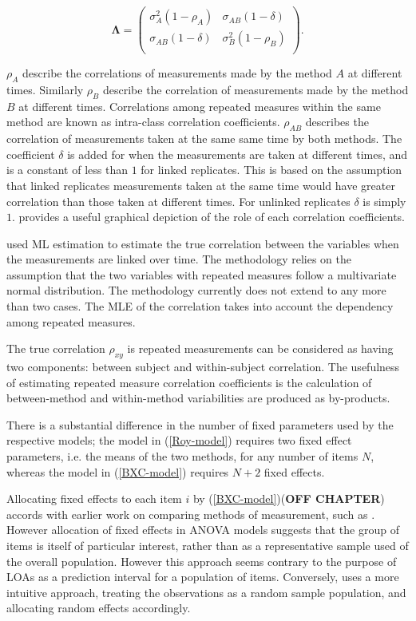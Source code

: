 \documentclass[12pt, a4paper]{report}
\theoremstyle{plain}
\theoremstyle{definition}
\theoremstyle{remark}
\begin{document}
	\[
	\boldsymbol{\Lambda} = \left(
	\begin{array}{cc}
	\sigma^2_{A}(1-\rho_{A}) & \sigma_{AB}(1-\delta)  \\
	\sigma_{AB}(1-\delta) & \sigma^2_{B}(1-\rho_{B}) \\
	\end{array}\right).
	\]
	
	$\rho_{A}$ describe the correlations of measurements made by the method $A$ at different times. Similarly $\rho_{B}$ describe the correlation of measurements made by the method $B$ at different times. Correlations among repeated measures within the same method are known as intra-class correlation coefficients. $\rho_{AB}$ describes the correlation of measurements taken at the same same time by both methods. The coefficient $\delta$ is added for when the measurements are taken at different times, and is a constant of less than $1$ for linked replicates. This is based on the assumption that linked replicates measurements taken at the same time would have greater correlation than those taken at different times. For unlinked replicates $\delta$ is simply $1$. \citet{hamlett} provides a useful graphical depiction of the role of each correlation coefficients.
	
	\citet{lam} used ML estimation to estimate the true correlation between the variables when the measurements are linked over time. The methodology relies on the assumption that the two variables with repeated measures follow a multivariate normal distribution. The methodology currently does not extend to any more than two cases. The MLE of the correlation takes into account the dependency among repeated measures.
	
	The true correlation $\rho_{xy}$ is repeated measurements can be considered as having two components: between subject and within-subject correlation. The usefulness of estimating repeated measure correlation coefficients is the calculation of between-method and within-method variabilities are produced as by-products.
	
	
	
	
	
	There is a substantial difference in the number of fixed parameters used by the respective models; the model in (\ref{Roy-model}) requires two fixed effect parameters, i.e. the means of the two methods, for any number of items $N$, whereas the model in (\ref{BXC-model}) requires $N+2$ fixed effects.
	
	Allocating fixed effects to each item $i$ by (\ref{BXC-model})(\textbf{OFF CHAPTER}) accords with earlier work on comparing methods of measurement, such as \citet{Grubbs48}. However allocation of fixed effects in ANOVA models suggests that the group of items is itself of particular interest, rather than as a representative sample used of the overall population. However this approach seems contrary to the purpose of LOAs as a prediction interval for a population of items. Conversely, \citet{ARoy2009}
	uses a more intuitive approach, treating the observations as a random sample population, and allocating random effects accordingly.
	
\end{document}
